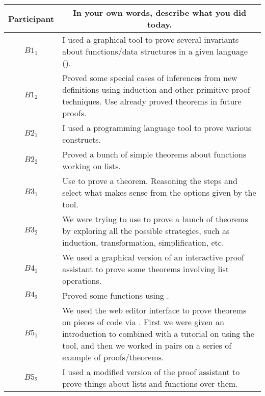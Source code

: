 \noindent
\begin{tabularx}{\linewidth}{@{}cX@{}}
  \toprule
  Participant & \multicolumn{1}{c}{
    \textbf{In your own words, describe what you did today.}
  } \\ \midrule
  $B1_{1}$ & I used a graphical tool to prove several invariants about functions/data structures in a given language (\Coq{}). \\
  $B1_{2}$ & Proved some special cases of inferences from new definitions using induction and other primitive proof techniques.  Use already proved theorems in future proofs. \\
  $B2_{1}$ & I used a programming language tool to prove various constructs. \\
  $B2_{2}$ & Proved a bunch of simple theorems about functions working on lists. \\
  $B3_{1}$ & Use \Coq{} to prove a theorem.  Reasoning the steps and select what makes sense from the options given by the tool. \\
  $B3_{2}$ & We were trying to use \PeaCoq{} to prove a bunch of theorems by exploring all the possible strategies, such as induction, transformation, simplification, etc. \\
  $B4_{1}$ & We used a graphical version of an interactive proof assistant to prove some theorems involving list operations. \\
  $B4_{2}$ & Proved some functions using \PeaCoq{}. \\
  $B5_{1}$ & We used the \PeaCoq{} web editor interface to prove theorems on pieces of code via \Coq{}.  First we were given an introduction to \Coq{} combined with a tutorial on using the tool, and then we worked in pairs on a series of example of proofs/theorems. \\
  $B5_{2}$ & I used a modified version of the \Coq{} proof assistant to prove things about lists and functions over them. \\
  \bottomrule
\end{tabularx}{\parfillskip=0pt\par}

\clearpage

